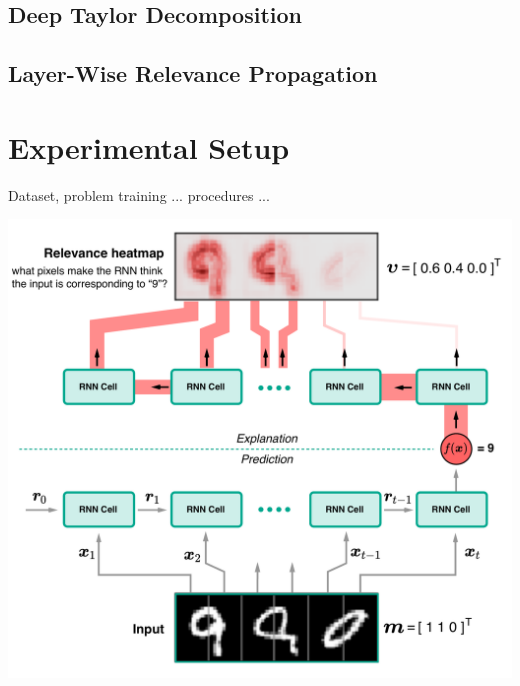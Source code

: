 \documentclass[a0,portrait]{a0poster}
\begin{document}
\begin{multicols}{2}

\subsection*{Deep Taylor Decomposition}
\cite{MontavonExplainingnonlinearclassification2017}
\subsection*{Layer-Wise Relevance Propagation}
\cite{BachPixelWiseExplanationsNonLinear2015}

\section*{Experimental Setup}
Dataset, problem training ... procedures ... 
\begin{center}\vspace{0.5cm}
\includegraphics[width=0.8\linewidth]{artificial_problem_with_rel_poster}
\end{center}\vspace{0.5cm}



\end{multicols}
\end{document}

